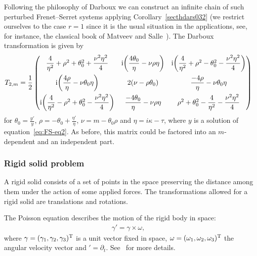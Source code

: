 \documentclass[pdftex]{sigma}%
\numberwithin{equation}{section}
\begin{document}
Following the philosophy of Darboux we can construct an infinite chain of such perturbed Frenet--Serret systems applying Corollary~\ref{secthdars032} (we restrict ourselves to the case $r=1$ since it is the usual situation in the applications, see, for instance,
the classical book of Matveev and Salle~\cite{MaSa91a}). The Darboux transformation is given by
\begin{gather*}
T_{2,m} = \dfrac{1}{2} \begin{pmatrix} \dfrac{4}{\eta^2} + \rho^2 + \theta_0 ^2 + \dfrac{\nu^2 \eta^2}{4} & {\rm i} \bigg (\dfrac{4\theta_0 }{\eta} - \nu \rho \eta \bigg ) & {\rm i} \bigg ( \dfrac{4}{\eta^2} + \rho^2 - \theta_0 ^2 - \dfrac{\nu^2 \eta^2}{4} \bigg )\\[10pt]
{\rm i} \bigg ( \dfrac{4\rho}{\eta} - \nu \theta_0 \eta \bigg ) & 2 ( \nu -\rho \theta_0 ) & \dfrac{-4\rho}{\eta} - \nu \theta_0 \eta \\[10pt]
{\rm i} \bigg ( \dfrac{4}{\eta^2} - \rho^2 + \theta_0 ^2 - \dfrac{\nu^2 \eta^2}{4} \bigg ) & \dfrac{-4\theta_0 }{\eta} - \nu \rho \eta & \rho^2 + \theta_0 ^2 - \dfrac{4}{\eta^2} - \dfrac{\nu^2 \eta^2}{4}
\end{pmatrix}
\end{gather*}
for $\theta_0 = \frac{y'}{y}$, $\rho = -\theta_0 + \frac{\eta'}{\eta}$, $\nu=m -\theta_0 \rho$ and $\eta = i\kappa - \tau$, where $y$ is a solution of equation~\eqref{eq:FS-eq2}.
As before, this matrix could be factored into an $m$-dependent and an independent part.


\subsubsection{Rigid solid problem}

A rigid solid consists of a set of points in the space preserving the distance among them under the action of some applied forces. The transformations allowed for a rigid solid are translations and rotations.

The Poisson equation describes the motion of the rigid body in space:
\begin{gather*}
\gamma' = \gamma \times \omega ,
\end{gather*}
where $\gamma = (\gamma_1, \gamma_2, \gamma_3)^{\rm T}$ is a unit vector fixed in space, $\omega = (\omega_1, \omega_2, \omega_3)^{\rm T}$ the angular velocity vector and ${}' = \partial_t$. See~\cite{acjios, femapr, femapr0} for more details.
\end{document}
